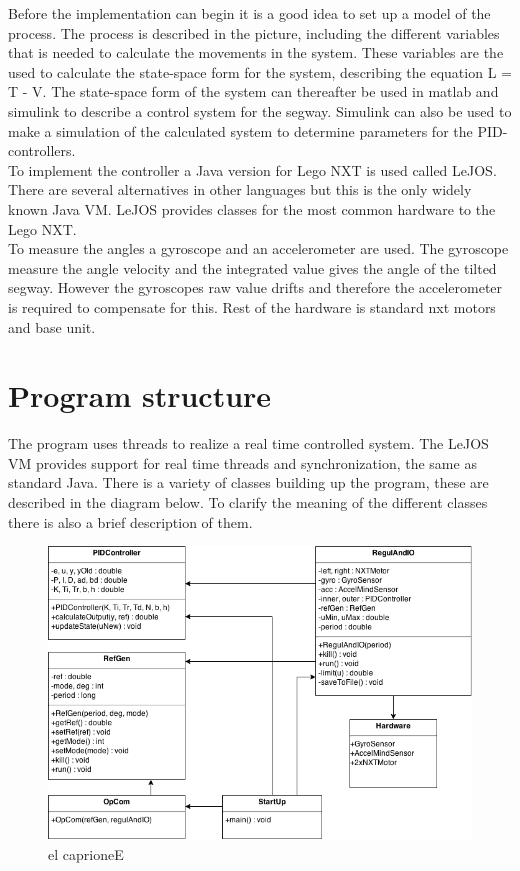 \documentclass[a4paper]{article}
\begin{document}
Before the implementation can begin it is a good idea to set up a model of the process. The process is described in the picture, including the different variables that is needed to calculate the movements in the system. These variables are the used to calculate the state-space form for the system, describing the equation L = T - V. The state-space form of the system can thereafter be used in matlab and simulink to describe a control system for the segway. Simulink can also be used to make a simulation of the calculated system to determine parameters for the PID-controllers. \\

To implement the controller a Java version for Lego NXT is used called LeJOS. There are several alternatives in other languages but this is the only widely known Java VM. LeJOS provides classes for the most common hardware to the Lego NXT.  \\

To measure the angles a gyroscope and an accelerometer are used. The gyroscope measure the angle velocity and the integrated value gives the angle of the tilted segway. However the gyroscopes raw value drifts and therefore the accelerometer is required to compensate for this. Rest of the hardware is standard nxt motors and base unit.



\section{Program structure}
The program uses threads to realize a real time controlled system. The LeJOS VM provides support for real time threads and synchronization, the same as standard Java. There is a variety of classes building up the program, these are described in the diagram below. To clarify the meaning of the different classes there is also a brief description of them.\\

\begin{figure}[H]
  \centering
\includegraphics[scale=0.5]{pic/UML_LEGO_SEGWAY_ALLCAPS.png}
\caption{el caprioneE}
\end{figure}
\end{document}
